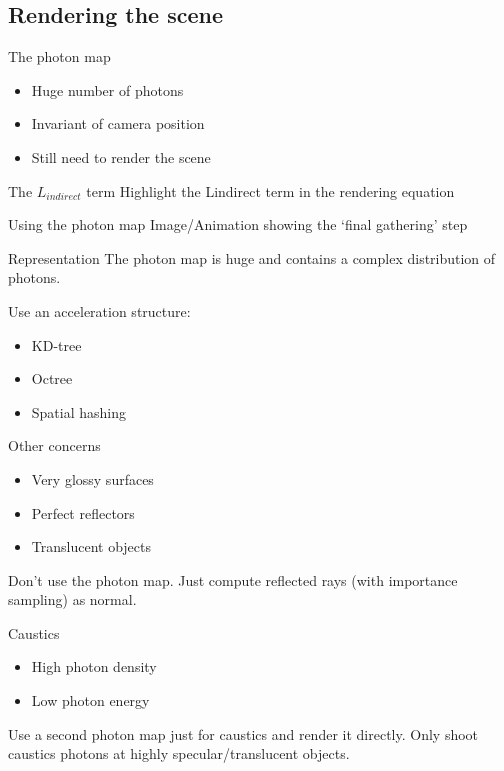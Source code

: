 \documentclass{beamer}
\begin{document}
		\subsection{Rendering the scene}
			\begin{frame}{The photon map}
				\begin{itemize}
					\item<2-> Huge number of photons
					\item<3-> Invariant of camera position
					\item<4-> Still need to render the scene
				\end{itemize}
			\end{frame}
			\begin{frame}{The \(L_{indirect}\) term}
				Highlight the Lindirect term in the rendering equation
			\end{frame}
			\begin{frame}{Using the photon map}
				Image/Animation showing the `final gathering' step
			\end{frame}
			\begin{frame}{Representation}
				The photon map is huge and contains a complex distribution of photons.

				Use an acceleration structure:
				\begin{itemize}
					\item<2-> KD-tree
					\item<3-> Octree
					\item<4-> Spatial hashing
				\end{itemize}
			\end{frame}
			\begin{frame}{Other concerns}
				\begin{itemize}
					\item<2-> Very glossy surfaces
					\item<3-> Perfect reflectors
					\item<4-> Translucent objects
				\end{itemize}
				\pause Don't use the photon map. Just compute reflected rays (with importance sampling) as normal.
			\end{frame}
			\begin{frame}{Caustics}
				\begin{itemize}
					\item<2-> High photon density
					\item<3-> Low photon energy
				\end{itemize}

				\pause Use a second photon map just for caustics and render it directly.
				\pause Only shoot caustics photons at highly specular/translucent objects.
			\end{frame}
\end{document}
